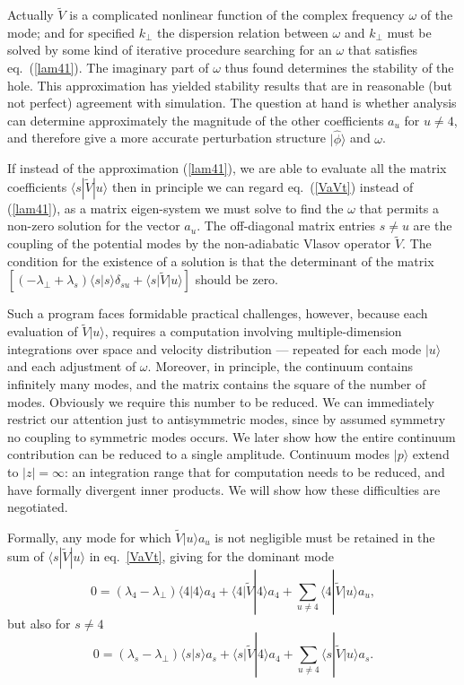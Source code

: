 \documentclass{jpp}
\def\ket#1{|#1\rangle}
\def\bra#1{\langle#1}
\begin{document}
Actually $\tilde{V}$ is a complicated nonlinear function of the
complex frequency $\omega$ of the mode; and for specified $k_\perp$
the dispersion relation between $\omega$ and $k_\perp$ must be solved
by some kind of iterative procedure searching for an $\omega$ that
satisfies eq.\ (\ref{lam41}). The imaginary part of $\omega$ thus found
determines the stability of the hole. This approximation has yielded
stability results
\citep{Hutchinson2018a,Hutchinson2019,Hutchinson2019a} that are in reasonable (but not perfect) agreement
with simulation.  The question at hand is whether analysis can
determine approximately the magnitude of the other coefficients $a_u$
for $u\not=4$, and therefore give a more accurate perturbation
structure $\ket{\hat\phi}$ and $\omega$.

If instead of the approximation (\ref{lam41}), we are able to evaluate all the
matrix coefficients $\bra{s}|\tilde{V}\ket{u}$ then in principle we can regard eq.\
(\ref{VaVt}) instead of (\ref{lam41}), as a matrix eigen-system we must
solve to find the $\omega$ that permits a non-zero solution for the
vector $a_u$. The off-diagonal matrix entries $s\not=u$ are the
coupling of the potential modes by the non-adiabatic Vlasov operator
$\tilde{V}$.  The condition for the existence of a solution is that the
determinant of the matrix
$[(-\lambda_\perp+\lambda_s)\bra{s}\ket{s}\delta_{su}+\bra{s}|\tilde{V}\ket{u}]$ should
be zero.

Such a program faces formidable practical challenges, however, because
each evaluation of $\tilde{V}\ket{u}$, requires a computation
involving multiple-dimension integrations over space and velocity
distribution --- repeated for each mode $\ket{u}$ and each adjustment
of $\omega$.  Moreover, in principle, the continuum contains
infinitely many modes, and the matrix contains the square of the
number of modes.  Obviously we require this number to be reduced. We
can immediately restrict our attention just to antisymmetric modes, since by
assumed symmetry no coupling to symmetric modes occurs. We later show
how the entire continuum contribution can be reduced to a single
amplitude. Continuum modes $\ket{p}$ extend to
$|z|=\infty$: an integration range that for computation needs to be
reduced, and have formally divergent inner products. We will show how
these difficulties are negotiated.

Formally, any mode for which $\tilde{V}\ket{u}a_u$ is not negligible
must be retained in the sum of $\bra{s}|\tilde{V}\ket{u}$ in eq.\
\ref{VaVt}, giving for the dominant mode
\begin{equation}
  \label{yes4}
  0=(\lambda_4-\lambda_\perp)\bra{4}\ket{4}a_4+\bra{4}|\tilde{V}\ket{4}a_4+\sum_{u\not=4}\bra{4}|\tilde{V}\ket{u}a_u,
\end{equation}
but also for $s\not=4$
\begin{equation}
  \label{not4}
 0=(\lambda_s-\lambda_\perp)\bra{s}\ket{s}a_s+\bra{s}|\tilde{V}\ket{4}a_4+\sum_{u\not=4}\bra{s}|\tilde{V}\ket{u}a_s.
\end{equation}
\end{document}
